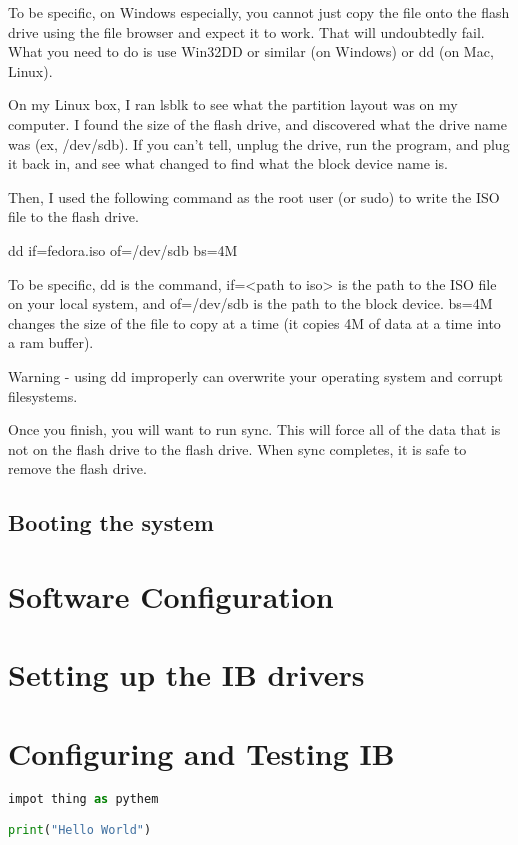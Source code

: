 \documentclass{article}
\begin{document}
To be specific, on Windows especially, you cannot just copy the file onto the flash drive using the file browser and expect it to work. That will undoubtedly fail. What you need to do is use Win32DD or similar (on Windows) or dd (on Mac, Linux).

On my Linux box, I ran lsblk to see what the partition layout was on my computer. I found the size of the flash drive, and discovered what the drive name was (ex, /dev/sdb). If you can't tell, unplug the drive, run the program, and plug it back in, and see what changed to find what the block device name is.

Then, I used the following command as the root user (or sudo) to write the ISO file to the flash drive.

dd if=fedora.iso of=/dev/sdb bs=4M

To be specific, dd is the command, if=<path to iso> is the path to the ISO file on your local system, and of=/dev/sdb is the path to the block device. bs=4M changes the size of the file to copy at a time (it copies 4M of data at a time into a ram buffer).

Warning - using dd improperly can overwrite your operating system and corrupt filesystems.

Once you finish, you will want to run sync. This will force all of the data that is not on the flash drive to the flash drive. When sync completes, it is safe to remove the flash drive.

\subsection{Booting the system}

\section{Software Configuration}

\section{Setting up the IB drivers}

\section{Configuring and Testing IB}

\begin{lstlisting}[language=Python, caption=Python Example]
impot thing as pythem

print("Hello World")

\end{lstlisting}
\end{document}

